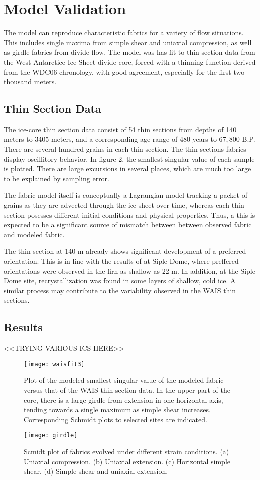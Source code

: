 \documentclass{article}
\begin{document}
\section{Model Validation}
The model can reproduce characteristic fabrics for a variety of flow situations. This includes single maxima from simple shear and uniaxial compression, as well as girdle fabrics from divide flow. The model was has fit to thin section data \citet{joan} from the West Antarctice Ice Sheet divide core, forced with a thinning function derived from the WDC06 chronology, with good agreement, especially for the first two thousand meters.

\subsection{Thin Section Data}
The ice-core thin section data consist of 54 thin sections from depths of 140 meters to 3405 meters, and a corresponding age range of 480 years to $67,800$ B.P. There are several hundred grains in each thin section. The thin sections fabrics display oscillitory behavior. In figure 2, the smallest singular value of each sample is plotted. There are large excursions in several places, which are much too large to be explained by sampling error. 

The fabric model itself is conceptually a Lagrangian model tracking a packet of grains as they are advected through the ice sheet over time, whereas each thin section posesses different initial conditions and physical properties. Thus, a this is expected to be a significant source of mismatch between between observed fabric and modeled fabric. 

The thin section at 140 m already shows significant development of a preferred orientation. This is in line with the results of \citet{diprinzio2005} at Siple Dome, where preffered orientations were observed in the firn as shallow as 22 m. In addition, at the Siple Dome site, recrystallization was found in some layers of shallow, cold ice. A similar process may contribute to the variability observed in the WAIS thin sections.

\subsection{Results}
<<TRYING VARIOUS ICS HERE>>
\begin{figure}
\caption{Plot of the modeled smallest  singular value of the modeled fabric versus that of the WAIS thin section data. In the upper part of the core, there is a large girdle from extension in one horizontal axis, tending towards a single maximum as simple shear increases. Corresponding Schmidt plots to selected sites are indicated.}
\texttt{[image: waisfit3]}
\end{figure}
\begin{figure}
   \caption{Scmidt plot of fabrics evolved under different strain conditions. (a) Uniaxial compression. (b) Uniaxial extension. (c) Horizontal simple shear. (d) Simple shear and uniaxial extension.} 
\texttt{[image: girdle]}
\end{figure}
\end{document}
